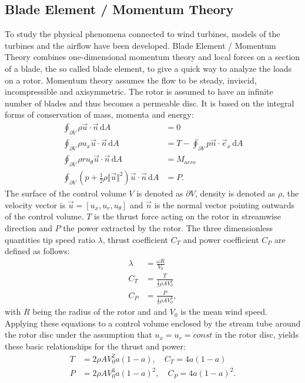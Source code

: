 \subsection{Blade Element / Momentum Theory}
To study the physical phenomena connected to wind turbines, models of the turbines and the airflow have been developed. Blade Element / Momentum Theory combines one-dimensional momentum theory and local forces on a section of a blade, the so called blade element, to give a quick way to analyze the loads on a rotor. Momentum theory assumes the flow to be steady, inviscid, incompressible and axisymmetric. The rotor is assumed to have an infinite number of blades and thus becomes a permeable disc. It is based on the integral forms of conservation of mass, momenta and energy:
\begin{align}
	\oint_{\partial V} \rho \vec{u} \cdot \vec{n} \, \mathrm{d}A &= 0 \label{eq:mass_cons}\\
	\oint_{\partial V} \rho u_x \vec{u} \cdot \vec{n} \, \mathrm{d}A &= T - \oint_{\partial V} p \vec{n}\cdot \vec{e}_x \, \mathrm{d}A   \label{eq:thrust} \\
	\oint_{\partial V} \rho r u_\theta \vec{u} \cdot \vec{n} \, \mathrm{d}A  &= M_{aero} \label{eq:torque}\\
	\oint_{\partial V} \left(p + \frac{1}{2} \rho \Vert\vec{u} \Vert^2\right) \vec{u} \cdot \vec{n} \, \mathrm{d}A  &= P. \label{eq:power}
\end{align}	The surface of the control volume $V$ is denoted as $\partial V$, density is denoted as $\rho$, the velocity vector is $\vec{u}= \left[u_x, u_r, u_\theta \right]$  and $\vec{n}$ is the normal vector pointing outwards of the control volume. $T$ is the thrust force acting on the rotor in streamwise direction and $P$ the power extracted by the rotor.
The three dimensionless quantities tip speed ratio $\lambda$, thrust coefficient $C_T$ and power coefficient $C_P$ are defined as follows:
\begin{align}
\lambda &= \frac{\omega R}{V_0} \\
C_T &= \frac{T}{\frac{1}{2} \rho A V_0^2} \\
C_P &= \frac{P}{\frac{1}{2} \rho A V_0^3},
\end{align}
with $R$ being the radius of the rotor and and $V_0$ is the mean wind speed.
Applying these equations to a control volume enclosed by the stream tube around the rotor disc under the assumption that $u_x = u_r = const$ in the rotor disc, yields these basic relationships for the thrust and power:
\begin{align}
	T &= 2 \rho A V_0^2 a(1-a), \quad C_T = 4a(1-a) \label{eq:thrust2}\\
	P &= 2 \rho A V_0^3 a(1-a)^2, \quad C_P = 4a(1-a)^2 \label{eq:power2}.
\end{align}
